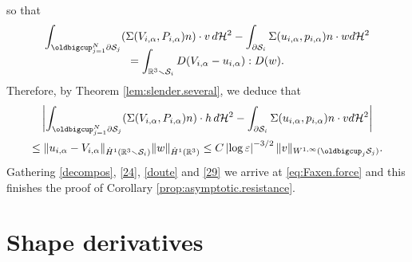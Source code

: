 \documentclass[JEP,XML,SOM,Unicode, NoEqCountersInSection,NoFloatCountersInSection,published]{cedram}
\newcommand{\R}{\mathbb{R}}
\let\eps\varepsilon
\theoremstyle{definition}
\theoremstyle{remark}
\begin{document}
so that
\begin{multline*}
\int_{\oldbigcup_{j=1}^N \partial \mathcal S_j} (\Sigma (V_{i,\alpha}, P_{i,\alpha}) n) \cdot v \, d\mathcal{H}^2
- \int_{\partial \mathcal S_i} \Sigma (u_{i,\alpha}, p_{i,\alpha}) n \cdot w {d\mathcal{H}^2}
\\[-8pt]
=\int_{\R^3 \smallsetminus \mathcal S_i } D(V_{i,\alpha} - u_{i,\alpha}) : D(w).
\end{multline*}
Therefore, by Theorem \ref{lem:slender.several}, we deduce that
\begin{multline}\label{29}
\biggl| \int_{\oldbigcup_{j=1}^N \partial \mathcal S_j} (\Sigma (V_{i,\alpha}, P_{i,\alpha}) n) \cdot h \, d\mathcal{H}^2
- \int_{\partial \mathcal S_i} \Sigma (u_{i,\alpha}, p_{i,\alpha}) n \cdot v {d\mathcal{H}^2}
\biggr| \\
\leq
\| u_{i,\alpha} - V_{i,\alpha}\|_{\dot H^1(\R^3 \smallsetminus \mathcal S_i)} \|w\|_{\dot H^1(\R^3)}
\leq C \left|\log \eps\right|^{-3/2} \|v\|_{W^{1,\infty}{(\oldbigcup_{j}\mathcal S_j)}}.
\end{multline}
Gathering
\eqref{decompos}, \eqref{24},
\eqref{doute}
and \eqref{29} we arrive at
\eqref{eq:Faxen.force} and
this finishes the proof of Corollary \ref{prop:asymptotic.resistance}.

\section{Shape derivatives}
\label{shape-derivative}
\end{document}
